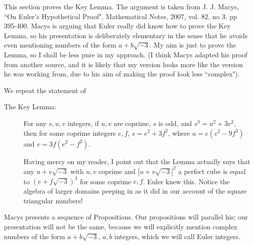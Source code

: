 \documentclass[12pt]{article}
\begin{document}
This section proves the Key Lemma.  The argument is taken from J. J. Macys, ``On Euler's Hypothetical Proof", Mathematical Notes, 2007, vol. 82, no 3, pp 395-400.  Macys is arguing that Euler really did know how to prove the Key Lemma, so his presentation is deliberately elementary in the sense that he avoids even mentioning numbers of the form $a+b\sqrt{-3}$.  My aim is just to prove the Lemma, so I shall be less pure in my approach.  (I think Macys adapted his proof from another source, and it is likely that my version looks more like the version he was working from, due to his aim of making the proof look less ``complex").

We repeat the statement of

\begin{description}

\item[The Key Lemma:]  For any $s,u,v$ integers, if $u,v$ are coprime, $s$ is odd,  and $s^3=u^2+3v^2$, then for some coprime integers $e,f$,
$s=e^2+3f^2$,  where $u=e(e^2-9f^2)$ and $v=3f(e^2-f^2)$.

Having mercy on my reader, I point out that the Lemma actually says that any $u+v\sqrt{-3}$ with $u,v$ coprime and $|u+v\sqrt{-3}|^2$ a perfect cube
is equal to $(e+f\sqrt{-3})^3$ for some coprime $e,f$.  Euler knew this.  Notice the algebra of larger domains peeping in as it did in our account of the square triangular numbers!

\end{description}

Macys presents a sequence of Propositions.  Our propositions will parallel his; our presentation will not be the same, because we will explicitly mention complex numbers of the form $a+b\sqrt{-3}$, $a,b$ integers, which we will call Euler integers.
\end{document}
